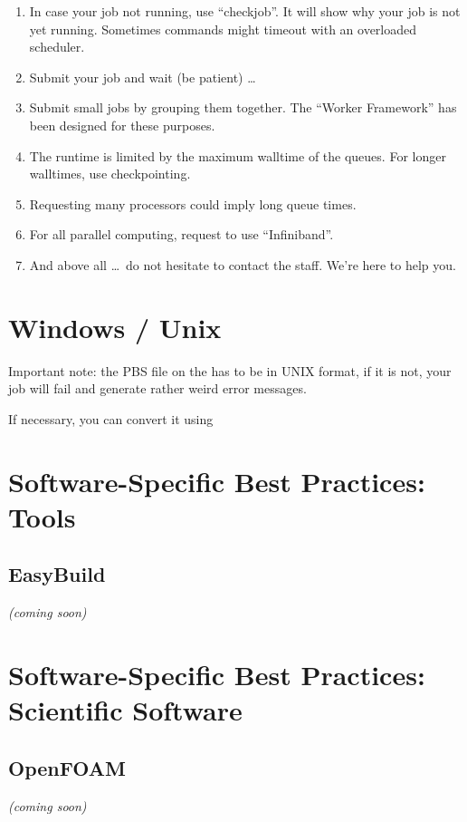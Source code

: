 \begin{enumerate}
  \item  In case your job not running, use ``checkjob''.  It will show why your
    job is not yet running. Sometimes commands might timeout with an overloaded
    scheduler.

  \item  Submit your job and wait (be patient) \ldots

  \item  Submit small jobs by grouping them together. The ``Worker Framework''
    has been designed for these purposes.

  \item  The runtime is limited by the maximum walltime of the queues. For
    longer walltimes, use checkpointing.

  \item  Requesting many processors could imply long queue times.

  \item  For all parallel computing, request to use ``Infiniband''.

  \item  And above all \dots\ do not hesitate to contact the \hpc staff. We're
    here to help you.
\end{enumerate}

\section{Windows / Unix}

Important note: the PBS file on the \hpc has to be in UNIX format, if it is
not, your job will fail and generate rather weird error messages.

If necessary, you can convert it using

\begin{prompt}
\end{prompt}


\section{Software-Specific Best Practices: Tools}
\label{sec:software-specific-best-practices-tools}

\subsection{EasyBuild}
\label{sec:best-practices-easybuild}

\textit{(coming soon)}

\section{Software-Specific Best Practices: Scientific Software}
\label{sec:software-specific-best-practices-scientific-software}

\subsection{OpenFOAM}
\label{sec:best-practices-openfoam}

\textit{(coming soon)}

